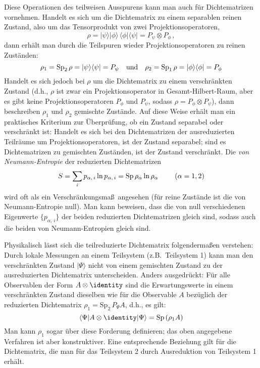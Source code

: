 Diese Operationen des teilweisen Ausspurens kann man
auch f\"ur Dichtematrizen vornehmen. Handelt es sich um die
Dichtematrix zu einem separablen reinen Zustand, also um
das Tensorprodukt von zwei Projektionsoperatoren,
\begin{equation}
    \rho =  | \psi \rangle |\phi \rangle \,   
       \langle \phi| \langle \psi|  =
        P_\psi \otimes P_\phi   \, ,
\end{equation}
dann erh\"alt man durch die Teilspuren wieder Projektionsoperatoren
zu reinen Zu\-st\"anden:
\begin{equation}
   \rho_1 = {\rm Sp}_2\, \rho = |\psi \rangle \langle \psi| = P_\psi
   ~~~  {\rm und} ~~~ 
   \rho_2 = {\rm Sp}_1\, \rho = |\phi \rangle \langle \phi| = P_\phi 
\end{equation}
Handelt es sich jedoch bei $\rho$ um die Dichtematrix zu einem
verschr\"ankten Zustand (d.h., $\rho$ ist zwar ein Projektionsoperator
in Gesamt-Hilbert-Raum, aber es
gibt keine Projektionsoperatoren $P_\phi$ und $P_\psi$, sodass
$\rho = P_\phi \otimes P_\psi$), dann beschreiben $\rho_1$ 
und $\rho_2$ gemischte Zust\"ande. Auf diese Weise erh\"alt
man ein praktisches Kriterium zur \"Uberpr\"ufung, ob ein Zustand
separabel oder verschr\"ankt ist: Handelt es sich bei den Dichtematrizen 
der ausreduzierten Teilr\"aume um Projektionsoperatoren, ist der Zustand 
separabel; sind es Dichtematrizen zu gemischten Zust\"anden, ist
der Zustand verschr\"ankt. 
Die {\em von Neumann-Entropie}
der reduzierten Dichtematrizen
\begin{equation}
    S = \sum_i p_{\alpha,\,i} \ln p_{\alpha,\,i} =
     {\rm Sp}\, \rho_\alpha \ln \rho_\alpha   
    ~~~~~~~  (\alpha=1,2)
\end{equation}
wird oft als ein Verschr\"ankungsma\ss\ angesehen (f\"ur reine
Zust\"ande ist die von Neumann-Entropie null). Man kann
beweisen, dass die von null verschiedenen Eigenwerte 
$\{p_{\alpha, \,i} \}$ der
beiden reduzierten Dichtematrizen gleich sind, sodass auch
die beiden von Neumann-Entropien gleich sind.

Physikalisch l\"asst sich die teilreduzierte Dichtematrix 
folgenderma\ss en verstehen: Durch lokale Messungen an einem Teilsystem
(z.B.\ Teilsystem 1) kann man
den verschr\"ankten Zustand $|\Psi\rangle$ nicht von einem gemischten
Zustand zu der ausreduzierten Dichtematrix 
unterscheiden. Anders ausgedr\"uckt: F\"ur alle Observablen
der Form $A\otimes \identity$ sind die Erwartungswerte in
einem verschr\"ankten Zustand dieselben wie f\"ur die
Observable $A$ bez\"uglich der reduzierten Dichtematrix 
$\rho_1=\mathrm{Sp}_2\, P_\Psi A$, d.h., es gilt:
\begin{equation}
     \langle \Psi | A \otimes \identity |  \Psi   \rangle = 
     \mathrm{Sp}\, (\rho_1 A )
\end{equation} 
Man kann $\rho_1$ sogar \"uber diese Forderung definieren; das oben
angegebene Verfahren ist aber konstruktiver.
Eine entsprechende Beziehung gilt f\"ur die Dichtematrix, die man
f\"ur das Teilsystem 2 durch Ausreduktion von Teilsystem 1 erh\"alt.

